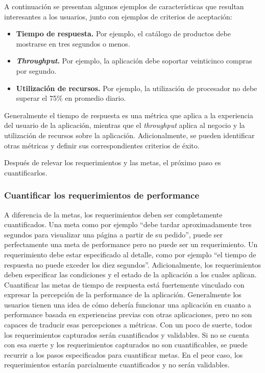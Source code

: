 A continuación se presentan algunos ejemplos de características que resultan interesantes a los usuarios, junto con ejemplos de criterios de aceptación:
\begin{itemize}
	\item
	\textbf{Tiempo de respuesta.} Por ejemplo, el catálogo de productos debe mostrarse en tres segundos o menos.
	\item
	\textbf{\emph{Throughput}.} Por ejemplo, la aplicación debe soportar veinticinco compras por segundo.
	\item
	\textbf{Utilización de recursos.} Por ejemplo, la utilización de procesador no debe superar el 75\% en promedio diario.
\end{itemize}

  Generalmente el tiempo de respuesta es una métrica que aplica a la experiencia del usuario de la aplicación, mientras que el \emph{throughput} aplica al negocio y la utilización de recursos sobre la aplicación. Adicionalmente, se pueden identificar otras métricas y definir sus correspondientes criterios de éxito.

Después de relevar los requerimientos y las metas, el próximo paso es cuantificarlos.

\subsubsection{Cuantificar los requerimientos de performance}  
A diferencia de la metas, los requerimientos deben ser completamente cuantificados. Una
meta como por ejemplo ``debe tardar aproximadamente tres segundos para visualizar una página a partir de su pedido'', puede ser perfectamente una meta de performance pero no puede ser
un requerimiento. Un requerimiento debe estar especificado al detalle, como por ejemplo ``el tiempo de respuesta no puede exceder los diez segundos''. Adicionalmente, los
requerimientos deben especificar las condiciones y el estado de la aplicación a los cuales aplican. 
Cuantificar las metas de tiempo de respuesta está fuertemente vinculado con expresar la percepción de la performance de la aplicación. Generalmente los usuarios tienen una idea de
cómo debería funcionar una aplicación en cuanto a performance basada en experiencias previas con otras aplicaciones, pero no son capaces de traducir esas percepciones a métricas. 
Con un poco de suerte, todos los requerimientos capturados serán cuantificados y validables. Si no se cuenta con esa suerte y los requerimientos capturados no son
cuantificables, se puede recurrir a los pasos especificados para cuantificar metas. En el peor caso, los requerimientos estarán parcialmente cuantificados y
no serán validables.

